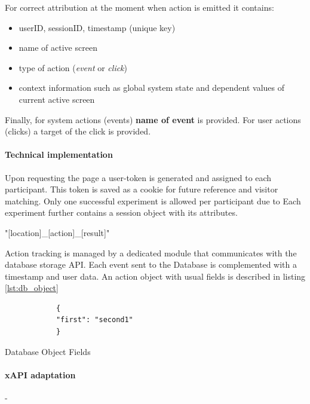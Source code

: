 	For correct attribution at the moment when action is emitted it contains: 
	\begin{itemize}
		\item userID, sessionID, timestamp (unique key)
		\item name of active screen
		\item type of action (\textit{event} or \textit{click})
		\item context information such as global system state and dependent values of current active screen
	\end{itemize}

	Finally, for system actions (events) \textbf{name of event} is provided. For user actions (clicks) a target of the click is provided.
	

	

		
		\paragraph{Technical implementation}
		
		Upon requesting the page a user-token is generated and assigned to each participant. This token is saved as a cookie for future reference and visitor matching. Only one successful experiment is allowed per participant due to 
		Each experiment further contains a session object with its attributes. 
		
		"[location]\_[action]\_[result]"
		
		
		Action tracking is managed by a dedicated module that communicates with the database storage API. Each event sent to the Database is complemented with a timestamp and user data. An action object with usual fields is described in listing \ref{lst:db_object}


	\begin{listing}[H]
		\begin{verbatim}
			{
			"first": "second1"
			}
		\end{verbatim}
		\caption{Database Object Fields}
		\label{lst:db_object}
	\end{listing}


		
		\paragraph{xAPI adaptation} - 
		
